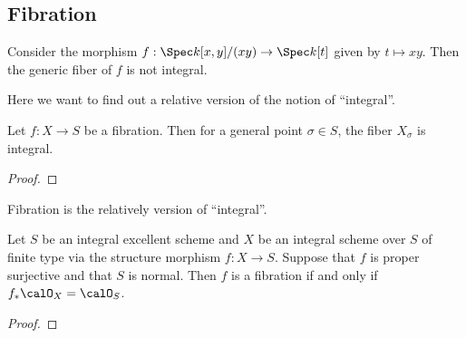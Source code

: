 \subsection{Fibration}

    \begin{example}\label{eg:generic_integral_does_not_hold}
        Consider the morphism \(f: \Spec k[x,y]/(xy) \to \Spec k[t]\) given by \(t \mapsto xy\).
        Then the generic fiber of \(f\) is not integral.
        \Yang{}
    \end{example}

    Here we want to find out a relative version of the notion of ``integral''.



    \begin{theorem}\label{thm:general_irreducible_of_fibration}
        Let \(f: X \to S\) be a fibration.
        Then for a general point \(\sigma \in S\), the fiber \(X_\sigma\) is integral.
    \end{theorem}
    \begin{proof}

        \Yang{}
    \end{proof}

    \begin{slogan}
        Fibration is the relatively version of ``integral''.
    \end{slogan}

    \begin{proposition}\label{prop:fibration_for_proper_morphism}
        Let \(S\) be an integral excellent scheme and \(X\) be an integral scheme over \(S\) of finite type via the structure morphism \(f: X \to S\).
        Suppose that \(f\) is proper surjective and that \(S\) is normal.
        Then \(f\) is a fibration if and only if \(f_*\calO_X = \calO_S\).
    \end{proposition}
    \begin{proof}
        \Yang{}
    \end{proof}


